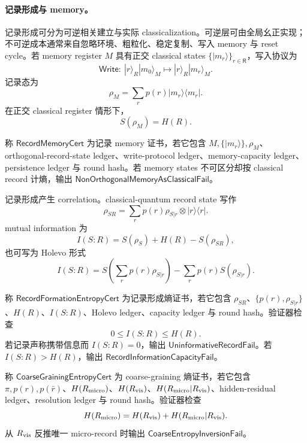 \paragraph{记录形成与 memory。}
记录形成可分为可逆相关建立与实际 classicalization。可逆层可由全局幺正实现；不可逆成本通常来自忽略环境、粗粒化、稳定复制、写入 memory 与 reset cycle。若 memory register \(M\) 具有正交 classical states \(\{|m_r\rangle\}_{r\in\mathsf R}\)，写入协议为
\[
\mathsf{Write}:\ |r\rangle_R|m_0\rangle_M
\longmapsto
|r\rangle_R|m_r\rangle_M.
\]
记录态为
\[
\rho_M=\sum_rp(r)|m_r\rangle\langle m_r|.
\]
在正交 classical register 情形下，
\[
\boxed{
S(\rho_M)=H(R).
}
\]

\begin{definition}[记录 memory 证书]\label{def:typed-address-biaxial-completion-record-memory-cert}
称 \(\mathsf{RecordMemoryCert}\) 为记录 memory 证书，若它包含 \(M,\{|m_r\rangle\},\rho_M\)、orthogonal-record-state ledger、write-protocol ledger、memory-capacity ledger、persistence ledger 与 round hash。若 memory states 不可区分却按 classical record 计熵，输出 \(\mathsf{NonOrthogonalMemoryAsClassicalFail}\)。
\end{definition}

记录形成产生 correlation。classical-quantum record state 写作
\[
\boxed{
\rho_{SR}
=
\sum_rp(r)\rho_{S|r}\otimes |r\rangle\langle r|.
}
\]
mutual information 为
\[
\boxed{
I(S:R)=S(\rho_S)+H(R)-S(\rho_{SR}),
}
\]
也可写为 Holevo 形式
\[
I(S:R)
=
S\!\left(\sum_rp(r)\rho_{S|r}\right)
-\sum_rp(r)S(\rho_{S|r}).
\]

\begin{definition}[记录形成熵证书]\label{def:typed-address-biaxial-completion-record-formation-entropy-cert}
称 \(\mathsf{RecordFormationEntropyCert}\) 为记录形成熵证书，若它包含 \(\rho_{SR}\)、\(\{p(r),\rho_{S|r}\}\)、\(H(R)\)、\(I(S:R)\)、Holevo ledger、capacity ledger 与 round hash。验证器检查
\[
0\le I(S:R)\le H(R).
\]
若记录声称携带信息而 \(I(S:R)=0\)，输出 \(\mathsf{UninformativeRecordFail}\)。若 \(I(S:R)>H(R)\)，输出 \(\mathsf{RecordInformationCapacityFail}\)。
\end{definition}

\begin{definition}\label{def:typed-address-biaxial-completion-coarse-graining-entropy-cert}
称 \(\mathsf{CoarseGrainingEntropyCert}\) 为 coarse-graining 熵证书，若它包含 \(\pi,p(r),p(\bar r)\)、\(H(R_{\rm micro})\)、\(H(R_{\rm vis})\)、\(H(R_{\rm micro}|R_{\rm vis})\)、hidden-residual ledger、resolution ledger 与 round hash。验证器检查
\[
H(R_{\rm micro})=H(R_{\rm vis})+H(R_{\rm micro}|R_{\rm vis}).
\]
从 \(R_{\rm vis}\) 反推唯一 micro-record 时输出 \(\mathsf{CoarseEntropyInversionFail}\)。
\end{definition}

